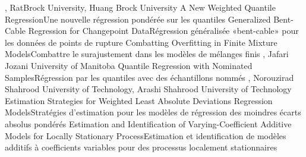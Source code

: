 {
,  {Rat}{Brock University},  {Huang}
{Brock University}
}
{A New Weighted Quantile Regression}{Une nouvelle régression pondérée sur les quantiles}
{\bubbleE \enspace \screenE}
{
}
{Generalized Bent-Cable Regression for Changepoint Data}{Régression généralisée «bent-cable» pour les données de points de rupture}
{\bubbleE \enspace \screenE}
{
}
{Combatting Overfitting in Finite Mixture Models}{Combattre le surajustement dans les modèles de mélanges finis}
{\bubbleE \enspace \screenE}
{
,  {Jafari Jozani}
{University of Manitoba}
}
{Quantile Regression with Nominated Samples}{Régression par les quantiles avec des échantillons nommés}
{\bubbleE \enspace \screenE}
{
,  {Norouzirad}
{Shahrood University of Technology},  {Arashi}
{Shahrood University of Technology}
}
{Estimation Strategies for Weighted Least Absolute Deviations Regression Models}{Stratégies d’estimation pour les modèles de régression des moindres écarts absolus pondérés }
{\bubbleE \enspace \screenE}
{
}
{Estimation and Identification of Varying-Coefficient Additive Models for Locally Stationary Process}{Estimation et identification de modèles additifs à coefficients variables pour des processus localement stationnaires}
{\bubbleE \enspace \screenE}


